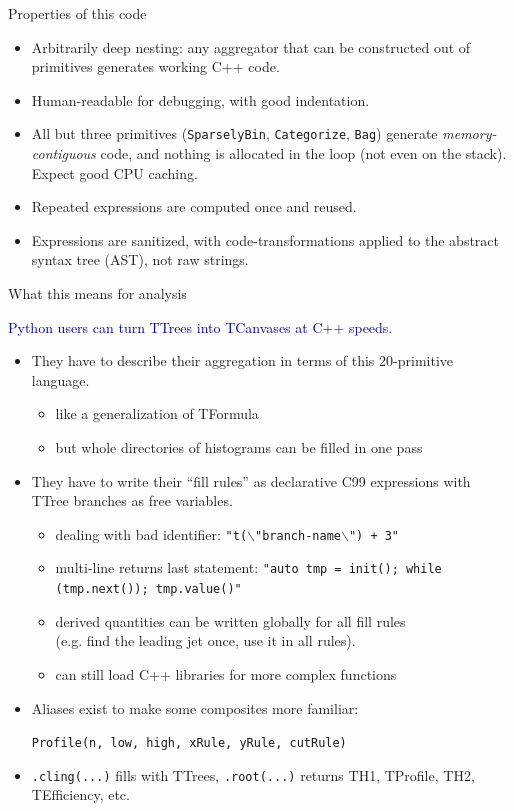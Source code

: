 \documentclass{beamer}
\begin{document}
\begin{frame}{Properties of this code}

\begin{itemize}\setlength{\itemsep}{0.35 cm}
\item Arbitrarily deep nesting: any aggregator that can be constructed out of primitives generates working C++ code.
\item Human-readable for debugging, with good indentation.
\item All but three primitives ({\tt\small SparselyBin}, {\tt\small Categorize}, {\tt\small Bag}) generate {\it memory-contiguous} code, and nothing is allocated in the loop (not even on the stack). Expect good CPU caching.
\item Repeated expressions are computed once and reused.
\item Expressions are sanitized, with code-transformations applied to the abstract syntax tree (AST), not raw strings.
\end{itemize}
\end{frame}

\begin{frame}{What this means for analysis}

\vspace{0.5 cm}
\textcolor{darkblue}{Python users can turn TTrees into TCanvases at C++ speeds.}

\begin{itemize}
\item They have to describe their aggregation in terms of this 20-primitive language.
\begin{itemize}
\item like a generalization of TFormula
\item but whole directories of histograms can be filled in one pass
\end{itemize}
\item They have to write their ``fill rules'' as declarative C99 expressions with TTree branches as free variables.
\begin{itemize}
\item dealing with bad identifier: {\tt\small "t($\backslash$"branch-name$\backslash$") + 3"}
\item multi-line returns last statement: {\tt\small "auto tmp = init(); while (tmp.next()); tmp.value()"}
\item derived quantities can be written globally for all fill rules \\ (e.g. find the leading jet once, use it in all rules).
\item can still load C++ libraries for more complex functions
\end{itemize}
\item Aliases exist to make some composites more familiar:

{\tt\small Profile(n, low, high, xRule, yRule, cutRule)}

\item {\tt\small .cling(...)} fills with TTrees, {\tt\small .root(...)} returns TH1, TProfile, TH2, TEfficiency, etc.
\end{itemize}
\end{frame}
\end{document}

